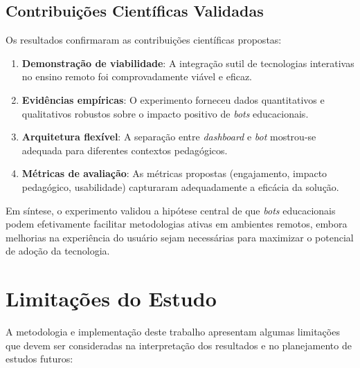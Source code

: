 \subsection{Contribuições Científicas Validadas}

Os resultados confirmaram as contribuições científicas propostas:

\begin{enumerate}
\item \textbf{Demonstração de viabilidade}: A integração sutil de tecnologias
interativas no ensino remoto foi comprovadamente viável e eficaz.
\item \textbf{Evidências empíricas}: O experimento forneceu dados quantitativos
e qualitativos robustos sobre o impacto positivo de \textit{bots} educacionais.
\item \textbf{Arquitetura flexível}: A separação entre \textit{dashboard} e
\textit{bot} mostrou-se adequada para diferentes contextos pedagógicos.
\item \textbf{Métricas de avaliação}: As métricas propostas (engajamento,
impacto pedagógico, usabilidade) capturaram adequadamente a eficácia da solução.
\end{enumerate}

Em síntese, o experimento validou a hipótese central de que \textit{bots}
educacionais podem efetivamente facilitar metodologias ativas em ambientes
remotos, embora melhorias na experiência do usuário sejam necessárias para
maximizar o potencial de adoção da tecnologia.

\section{Limitações do Estudo}
\label{sec:limitacoes-conclusao}

A metodologia e implementação deste trabalho apresentam algumas limitações que
devem ser consideradas na interpretação dos resultados e no planejamento de
estudos futuros:

